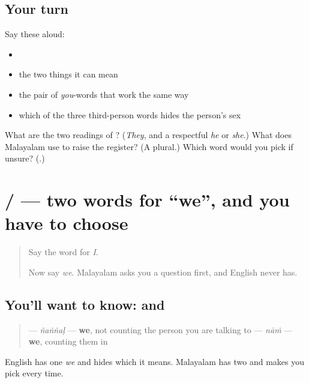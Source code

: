 \subsection*{Your turn}
Say these aloud:

\begin{itemize}
\raggedright
  \item {}
  \item the two things it can mean
  \item the pair of \emph{you}-words that work the same way
  \item which of the three third-person words hides the person's sex
\end{itemize}

\begin{tcolorbox}[breakable,colback=teal!4,colframe=teal!35!black,title={Before you move on}]
What are the two readings of \textbf{}? (\emph{They}, and a respectful \emph{he} or \emph{she}.) What does Malayalam use to raise the register? (A plural.) Which word would you pick if unsure? (\textbf{}.)
\end{tcolorbox}
\section[\texorpdfstring{\ml{ഞങ്ങൾ} / \ml{നാം} (ñaṅṅaḷ / nāṁ)}{ഞങ്ങൾ / നാം (ñaṅṅaḷ / nāṁ)}]{ /  — two words for \textquotedblleft{}we\textquotedblright{}, and you have to choose}

\label{lesson:ML-C71-njangal-naam}



\begin{quote}
Say the word for \emph{I}.

Now say \emph{we}. Malayalam asks you a question first, and English never has.
\end{quote}

\subsection*{You'll want to know:  and }
\begin{quote}
\textbf{} — \emph{ñaṅṅaḷ} — \textbf{we}, not counting the person you are talking to \textbf{} — \emph{nāṁ} — \textbf{we}, counting them in
\end{quote}

English has one \emph{we} and hides which it means. Malayalam has two and makes you pick every time.

